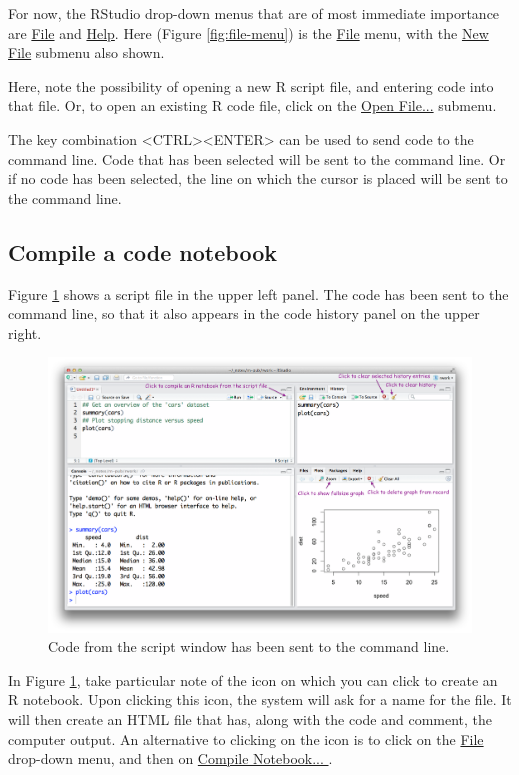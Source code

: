 For now, the RStudio drop-down menus that are of most immediate
importance are \underline{File} and \underline{Help}.  Here (Figure
\ref{fig:file-menu}) is the \underline{File} menu, with the
\underline{New File} submenu also shown.

Here, note the possibility of opening a new R script file, and
entering code into that file. Or, to open an existing R code file,
click on the \underline{Open File...} submenu.

The key combination <CTRL><ENTER> can be used to send code
to the command line.  Code that has been selected will be sent to the
command line.  Or if no code has been selected, the line on which the
cursor is placed will be sent to the command line.

\subsection{Compile a code notebook}

Figure \ref{fig:code-history} shows a script file in the upper left
panel.  The code has been sent to the command line, so that it also
appears in the code history panel on the upper right.

\begin{figure}
\includegraphics{figs-inc/03i-3panels.png}
\vspace*{-15pt}

\caption{Code from the script window has been sent to the command
  line.}\label{fig:code-history}
\end{figure}

In Figure \ref{fig:code-history}, take particular note of the icon on
which you can click to create an R notebook. Upon clicking this icon,
the system will ask for a name for the file.  It will then create an
HTML file that has, along with the code and comment, the computer
output.
  An alternative to clicking on the icon is to
click on the \underline{File} drop-down menu, and then on
\underline{Compile Notebook... }.

